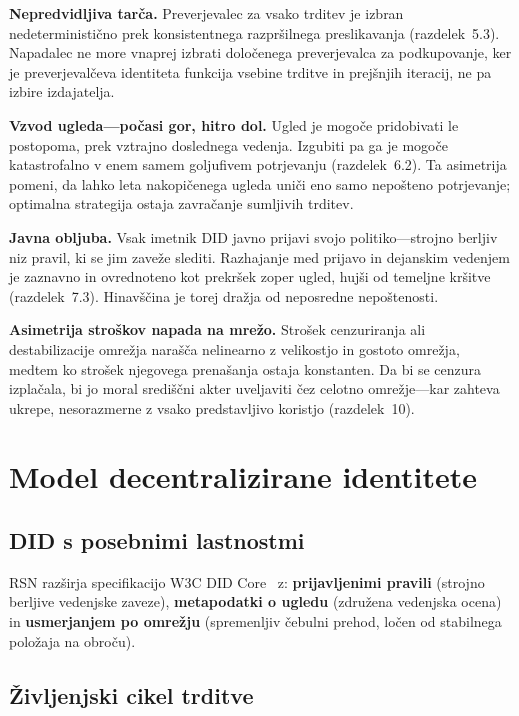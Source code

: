 \documentclass[11pt,a4paper,twocolumn]{article}
\begin{document}
\textbf{Nepredvidljiva tarča.} Preverjevalec za vsako trditev je izbran nedeterministično prek konsistentnega razpršilnega preslikavanja (razdelek~5.3). Napadalec ne more vnaprej izbrati določenega preverjevalca za podkupovanje, ker je preverjevalčeva identiteta funkcija vsebine trditve in prejšnjih iteracij, ne pa izbire izdajatelja.

\textbf{Vzvod ugleda---počasi gor, hitro dol.} Ugled je mogoče pridobivati le postopoma, prek vztrajno doslednega vedenja. Izgubiti pa ga je mogoče katastrofalno v enem samem goljufivem potrjevanju (razdelek~6.2). Ta asimetrija pomeni, da lahko leta nakopičenega ugleda uniči eno samo nepošteno potrjevanje; optimalna strategija ostaja zavračanje sumljivih trditev.

\textbf{Javna obljuba.} Vsak imetnik DID javno prijavi svojo politiko---strojno berljiv niz pravil, ki se jim zaveže slediti. Razhajanje med prijavo in dejanskim vedenjem je zaznavno in ovrednoteno kot prekršek zoper ugled, hujši od temeljne kršitve (razdelek~7.3). Hinavščina je torej dražja od neposredne nepoštenosti.

\textbf{Asimetrija stroškov napada na mrežo.} Strošek cenzuriranja ali destabilizacije omrežja narašča nelinearno z velikostjo in gostoto omrežja, medtem ko strošek njegovega prenašanja ostaja konstanten. Da bi se cenzura izplačala, bi jo moral središčni akter uveljaviti čez celotno omrežje---kar zahteva ukrepe, nesorazmerne z vsako predstavljivo koristjo (razdelek~10).

\section{Model decentralizirane identitete}

\subsection{DID s posebnimi lastnostmi}

RSN razširja specifikacijo W3C DID Core~\cite{did2022} z: \textbf{prijavljenimi pravili} (strojno berljive vedenjske zaveze), \textbf{metapodatki o ugledu} (združena vedenjska ocena) in \textbf{usmerjanjem po omrežju} (spremenljiv čebulni prehod, ločen od stabilnega položaja na obroču).

\subsection{Življenjski cikel trditve}
\end{document}
